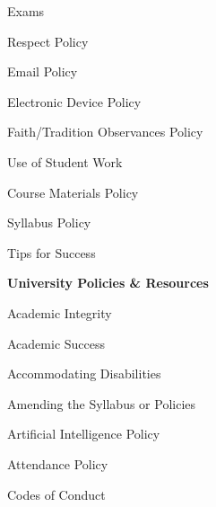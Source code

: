 \documentclass[11pt,letterpaper]{article}
\begin{document}
\begin{minipage}[t]{0.45\textwidth}
\hspace{0.3cm} Exams \dotfill \pageref{exams} \par
\hspace{0.3cm} Respect Policy \dotfill \pageref{respect} \par
\hspace{0.3cm} Email Policy \dotfill \pageref{email_policy} \par 
\hspace{0.3cm} Electronic Device Policy \dotfill \pageref{electronic} \par
\hspace{0.3cm} Faith/Tradition Observances Policy \dotfill \pageref{faith}
\end{minipage} \hfill \begin{minipage}[t]{0.45\textwidth} \par %
\hspace{0.3cm} Use of Student Work \dotfill \pageref{std_work} \par
\hspace{0.3cm} Course Materials Policy \dotfill \pageref{copyright} \par
\hspace{0.3cm} Syllabus Policy \dotfill \pageref{syllabus} \par
\hspace{0.3cm} Tips for Success \dotfill \pageref{tips} \par
{\bfseries\color{scred} University Policies \& Resources} \dotfill \pageref{univ_policies} \par
\hspace{0.3cm} Academic Integrity \dotfill \pageref{univ_academicintegrity} \par
\hspace{0.3cm} Academic Success \dotfill \pageref{univ_success} \par
\hspace{0.3cm} Accommodating Disabilities \dotfill \pageref{univ_ada} \par
\hspace{0.3cm} Amending the Syllabus or Policies \dotfill \pageref{univ_amending} \par
\hspace{0.3cm} Artificial Intelligence Policy \dotfill \pageref{univ_artintel} \par
\hspace{0.3cm} Attendance Policy \dotfill \pageref{univ_attendance} \par
\hspace{0.3cm} Codes of Conduct \dotfill \pageref{univ_conduct} \par

\end{minipage}
\end{document}
